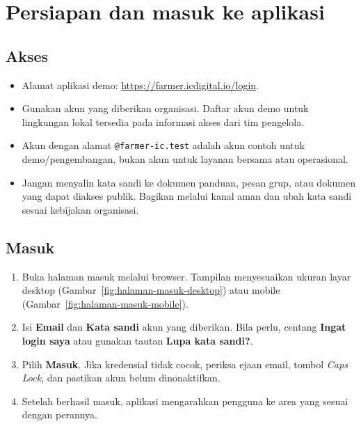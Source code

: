 \section{Persiapan dan masuk ke aplikasi}

\subsection{Akses}

\begin{itemize}
  \item Alamat aplikasi demo: \url{https://farmer.icdigital.io/login}.
  \item Gunakan akun yang diberikan organisasi. Daftar akun demo untuk lingkungan lokal tersedia pada informasi akses dari tim pengelola.
  \item Akun dengan alamat \texttt{@farmer-ic.test} adalah akun contoh untuk demo/pengembangan, bukan akun untuk layanan bersama atau operasional.
  \item Jangan menyalin kata sandi ke dokumen panduan, pesan grup, atau dokumen yang dapat diakses publik. Bagikan melalui kanal aman dan ubah kata sandi sesuai kebijakan organisasi.
\end{itemize}

\subsection{Masuk}

\begin{enumerate}
  \item Buka halaman masuk melalui browser. Tampilan menyesuaikan ukuran layar desktop (Gambar~\ref{fig:halaman-masuk-desktop}) atau mobile (Gambar~\ref{fig:halaman-masuk-mobile}).
  \item Isi \textbf{Email} dan \textbf{Kata sandi} akun yang diberikan. Bila perlu, centang \textbf{Ingat login saya} atau gunakan tautan \textbf{Lupa kata sandi?}.
  \item Pilih \textbf{Masuk}. Jika kredensial tidak cocok, periksa ejaan email, tombol \emph{Caps Lock}, dan pastikan akun belum dinonaktifkan.
  \item Setelah berhasil masuk, aplikasi mengarahkan pengguna ke area yang sesuai dengan perannya.
\end{enumerate}


